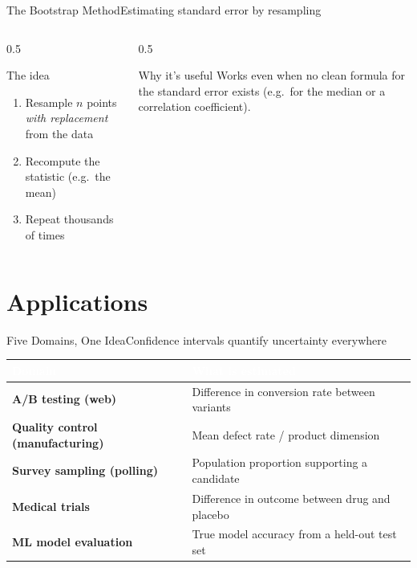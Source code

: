 \documentclass[aspectratio=169,11pt]{beamer}
\begin{document}
\begin{frame}{The Bootstrap Method}{Estimating standard error by resampling}
  \begin{columns}[T]
    \begin{column}{0.5\textwidth}
      \begin{block}{The idea}
        \small
        \begin{enumerate}
          \item Resample $n$ points \emph{with replacement} from the data
          \item Recompute the statistic (e.g.\ the mean)
          \item Repeat thousands of times
        \end{enumerate}
      \end{block}
    \end{column}
    \begin{column}{0.5\textwidth}
      \begin{exampleblock}{Why it's useful}
        \small Works even when no clean formula for the standard error
        exists (e.g.\ for the median or a correlation coefficient).
      \end{exampleblock}
    \end{column}
  \end{columns}
\end{frame}

\section{Applications}

\begin{frame}{Five Domains, One Idea}{Confidence intervals quantify uncertainty everywhere}
  \small
  \renewcommand{\arraystretch}{1.3}
  \begin{center}
  \begin{tabularx}{\textwidth}{@{}>{\bfseries}l >{\raggedright\arraybackslash}X@{}}
    \toprule
    \rowcolor{PrimaryDark}
    \textcolor{white}{Domain} & \textcolor{white}{What is estimated} \\
    \midrule
    A/B testing (web) & Difference in conversion rate between variants \\
    \rowcolor{PrimaryLight!25}
    Quality control (manufacturing) & Mean defect rate / product dimension \\
    Survey sampling (polling) & Population proportion supporting a candidate \\
    \rowcolor{PrimaryLight!25}
    Medical trials & Difference in outcome between drug and placebo \\
    ML model evaluation & True model accuracy from a held-out test set \\
    \bottomrule
  \end{tabularx}
  \end{center}
\end{frame}
\end{document}
